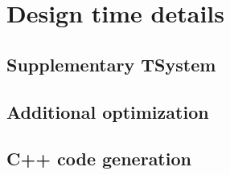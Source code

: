 \chapter{Design time details}



\section{Supplementary TSystem}


\section{Additional optimization}


\section{C++ code generation}


